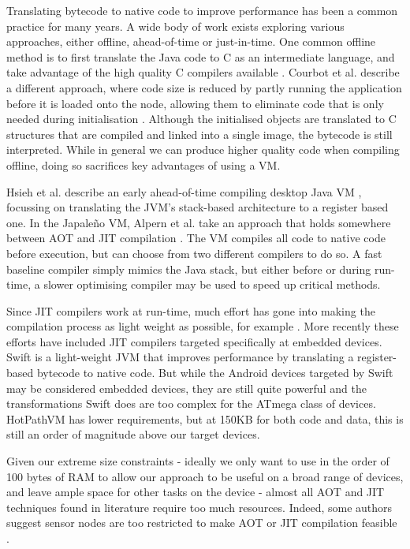 Translating bytecode to native code to improve performance has been a common practice for many years. A wide body of work exists exploring various approaches, either offline, ahead-of-time  or just-in-time. One common offline method is to first translate the Java code to C as an intermediate language, and take advantage of the high quality C compilers available \cite{Dean:1996wb, Muller:1997}. Courbot et al. describe a different approach, where code size is reduced by partly running the application before it is loaded onto the node, allowing them to eliminate code that is only needed during initialisation \cite{Courbot:2010}. Although the initialised objects are translated to C structures that are compiled and linked into a single image, the bytecode is still interpreted. While in general we can produce higher quality code when compiling offline, doing so sacrifices key advantages of using a VM.

Hsieh et al. describe an early ahead-of-time compiling desktop Java VM \cite{Hsieh:1996cy}, focussing on translating the JVM's stack-based architecture to a register based one. In the Japale\~no VM, Alpern et al. take an approach that holds somewhere between AOT and JIT compilation \cite{Alpern:1999}. The VM compiles all code to native code before execution, but can choose from two different compilers to do so. A fast baseline compiler simply mimics the Java stack, but either before or during run-time, a slower optimising compiler may be used to speed up critical methods.

Since JIT compilers work at run-time, much effort has gone into making the compilation process as light weight as possible, for example \cite{Krall:1998}. More recently these efforts have included JIT compilers targeted specifically at embedded devices. Swift \cite{Zhang:2012wf} is a light-weight JVM that improves performance by translating a register-based bytecode to native code. But while the Android devices targeted by Swift may be considered embedded devices, they are still quite powerful and the transformations Swift does are too complex for the ATmega class of devices. HotPathVM \cite{Gal:2006} has lower requirements, but at 150KB for both code and data, this is still an order of magnitude above our target devices.

Given our extreme size constraints - ideally we only want to use in the order of 100 bytes of RAM to allow our approach to be useful on a broad range of devices, and leave ample space for other tasks on the device - almost all AOT and JIT techniques found in literature require too much resources. Indeed, some authors suggest sensor nodes are too restricted to make AOT or JIT compilation feasible \cite{Aslam:2011thesis, Wirjawan:2008}.

